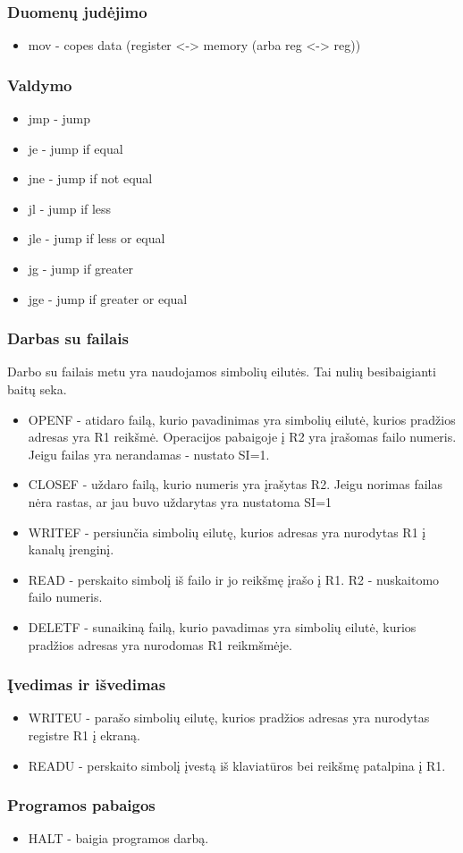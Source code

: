 \documentclass{VUMIFInfKursinis}
\begin{document}
\subsubsection{Duomenų judėjimo}
\begin{itemize}
	\item mov - copes data (register <-> memory (arba reg <-> reg))
\end{itemize}

\subsubsection{Valdymo}
\begin{itemize}
	\item jmp - jump
	\item je - jump if equal
	\item jne - jump if not equal
	\item jl - jump if less
	\item jle - jump if less or equal
	\item jg - jump if greater
	\item jge - jump if greater or equal
\end{itemize}

\subsubsection{Darbas su failais}
Darbo su failais metu yra naudojamos simbolių eilutės. Tai nulių besibaigianti baitų seka.
\begin{itemize}
	\item OPENF - atidaro failą, kurio pavadinimas yra simbolių eilutė, kurios pradžios adresas yra R1 reikšmė. Operacijos pabaigoje į R2 yra įrašomas failo numeris. Jeigu failas yra nerandamas - nustato SI=1.
	\item CLOSEF - uždaro failą, kurio numeris yra įrašytas  R2. Jeigu norimas failas nėra rastas, ar jau buvo uždarytas yra nustatoma SI=1
	\item WRITEF - persiunčia simbolių eilutę, kurios adresas yra nurodytas R1 į kanalų įrenginį.
	\item READ - perskaito simbolį iš failo ir jo reikšmę įrašo į R1. R2 - nuskaitomo failo numeris.
	\item DELETF - sunaikiną failą, kurio pavadimas yra simbolių eilutė, kurios pradžios adresas yra nurodomas R1 reikmšmėje.
\end{itemize}

\subsubsection{Įvedimas ir išvedimas}
\begin{itemize}
	\item WRITEU - parašo simbolių eilutę, kurios pradžios adresas yra nurodytas registre R1 į ekraną.
	\item READU - perskaito simbolį įvestą iš klaviatūros bei reikšmę patalpina į R1.
\end{itemize}

\subsubsection{Programos pabaigos}
\begin{itemize}
	\item HALT - baigia programos darbą.
\end{itemize}

\printbibliography[heading=bibintoc] %
\appendix  %
\end{document}
